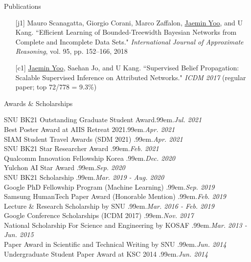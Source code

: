 \documentclass{resume} %
\makeatletter
\newcommand \Dotfill {\leavevmode \cleaders \hb@xt@ .99em{\hss .\hss }\hfill \kern \z@}
\makeatother
\begin{document}
\begin{rSection}{Publications}
\begin{enumerate}
	\item[{[j1]}] Mauro Scanagatta, Giorgio Corani, Marco Zaffalon, \underline{Jaemin Yoo}, and U Kang.
		``Efficient Learning of Bounded-Treewidth Bayesian Networks from Complete and Incomplete Data Sets."
		\emph{International Journal of Approximate Reasoning}, vol. 95, pp. 152--166, 2018

	\item[{[c1]}] \underline{Jaemin Yoo}, Saehan Jo, and U Kang.
		``Supervised Belief Propagation: Scalable Supervised Inference on Attributed Networks."
		\emph{ICDM 2017} (regular paper; top 72/778 = 9.3\%)

\end{enumerate}
\end{rSection}


\begin{rSection}{Awards \& Scholarships}

SNU BK21 Outstanding Graduate Student Award\smallskip \Dotfill \emph{Jul. 2021} \\ 
Best Poster Award at AIIS Retreat 2021\smallskip \Dotfill \emph{Apr. 2021} \\ 
SIAM Student Travel Awards (SDM 2021) \smallskip \Dotfill \emph{Apr. 2021} \\ 
SNU BK21 Star Researcher Award \smallskip \Dotfill \emph{Feb. 2021} \\ 
Qualcomm Innovation Fellowship Korea \smallskip \Dotfill \emph{Dec. 2020} \\ 
Yulchon AI Star Award \smallskip \Dotfill \emph{Sep. 2020} \\ 
SNU BK21 Scholarship \smallskip \Dotfill \emph{Mar. 2019 - Aug. 2020} \\ 
Google PhD Fellowship Program (Machine Learning) \smallskip \Dotfill \emph{Sep. 2019} \\ 
Samsung HumanTech Paper Award (Honorable Mention) \smallskip \Dotfill \emph{Feb. 2019} \\ 
Lecture \& Research Scholarship by SNU \smallskip \Dotfill \emph{Mar. 2016 - Feb. 2019} \\ 
Google Conference Scholarships (ICDM 2017) \smallskip \Dotfill \emph{Nov. 2017} \\ 
National Scholarship For Science and Engineering by KOSAF \smallskip \Dotfill \emph{Mar. 2013 - Jun. 2015} \\
Paper Award in Scientific and Technical Writing by SNU \smallskip \Dotfill \emph{Jun. 2014} \\ 
Undergraduate Student Paper Award at KSC 2014 \smallskip \Dotfill \emph{Jun. 2014}

\end{rSection}
\end{document}
